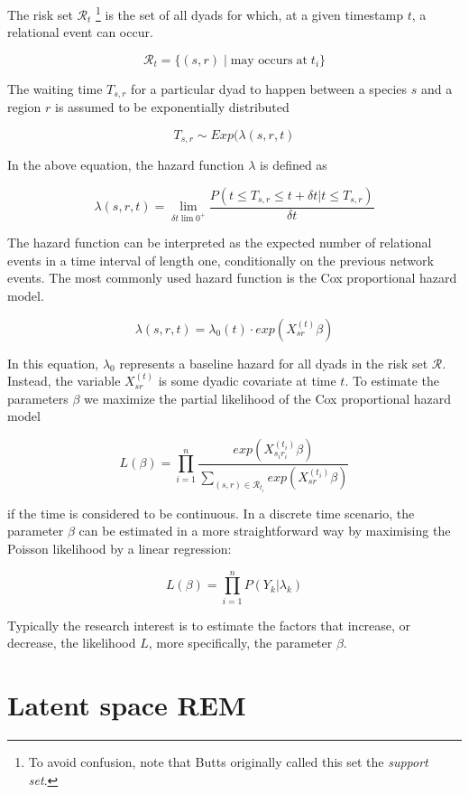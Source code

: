 \documentclass[mscthesis]{usiinfthesis}
\begin{document}
The risk set $\mathcal{R}_t$ \footnote{To avoid confusion, note that Butts originally called this set the \textit{support set}.} is the set of all dyads for which, at a given timestamp $t$, a relational event can occur.

\[
\mathcal{R}_{t} = \{(s,r) \; | \; \textrm{may occurs} \; \textrm{at} \; t_i\}
\]

The waiting time $T_{s,r}$ for a particular dyad to happen between a species $s$ and a region $r$ is assumed to be exponentially distributed 

\[
T_{s,r} \sim Exp(\lambda(s, r, t)
\]


In the above equation, the hazard function $\lambda$ is defined as

\[
\lambda(s, r, t) = \lim_{\delta t \lim 0^+} \frac{P(t \leq T_{s,r} \leq t + \delta t | t \leq T_{s,r})}{\delta t}
\]

The hazard function can be interpreted as the expected number of relational events in a time interval of length one, conditionally on the previous network events. The most commonly used hazard function is the Cox proportional hazard model. 


\[
\lambda(s, r, t) = \lambda_0(t) \cdot exp({X_{sr}^{(t)} \beta} )
\]

In this equation, $\lambda_0$ represents a baseline hazard for all dyads in the risk set $\mathcal{R}$. Instead, the variable $X_{sr}^{(t)}$ is some dyadic covariate at time $t$. To estimate the parameters $\beta$ we maximize the partial likelihood of the Cox proportional hazard model 


\[
L(\beta) =  \prod_{i=1}^n \frac{exp (X_{s_i r_i}^{(t_i)} \beta) }{ \sum_{(s,r) \in \mathcal{R}_{t_i}} exp({X_{sr}^{(t_i)} \beta} )}
\]

if the time is considered to be continuous. In a discrete time scenario, the parameter $\beta$ can be estimated in a more straightforward way by maximising the Poisson likelihood by a linear regression:

\[
L(\beta) =  \prod_{i=1}^n P(Y_k | \lambda_k)
\]


Typically the research interest is to estimate the factors that increase, or decrease, the likelihood $L$, more specifically, the parameter $\beta$.


\section{Latent space REM}
 
\end{document}
